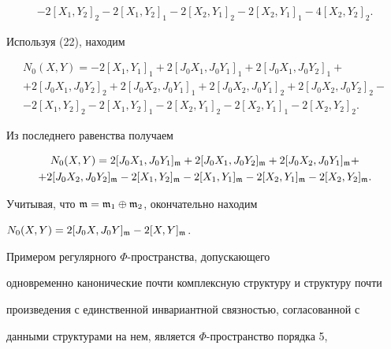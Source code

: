 \begin{pf}
\begin{multline*}
-2[X_1,Y_2]_2-2[X_1,Y_2]_1-2[X_2,Y_1]_2- 


2[X_2,Y_1]_1-4[X_2,Y_2]_2. 


\end{multline*} 


Используя (22), находим 


\begin{multline*} 


N_0(X,Y)=-2[X_1,Y_1]_1+2[J_0X_1,J_0Y_1]_1+ 


2[J_0X_1,J_0Y_2]_1 + \\ 


+2[J_0X_1,J_0Y_2]_2+2[J_0X_2,J_0Y_1]_1+ 


2[J_0X_2,J_0Y_1]_2+2[J_0X_2,J_0Y_2]_2- \\ 


-2[X_1,Y_2]_2-2[X_1,Y_2]_1-2[X_2,Y_1]_2- 


2[X_2,Y_1]_1-2[X_2,Y_2]_2. 


\end{multline*} 


Из последнего равенства получаем 


\begin{multline*} 


N_0(X,Y)=2[J_0X_1,J_0Y_1]_{\frak m}+ 


2[J_0X_1,J_0Y_2]_{\frak m}+2[J_0X_2,J_0Y_1]_{\frak m}+ \\ 


% 


+2[J_0X_2,J_0Y_2]_{\frak m}-2[X_1,Y_2]_{\frak m}- 


2[X_1,Y_1]_{\frak m}-2[X_2,Y_1]_{\frak m}- 


2[X_2,Y_2]_{\frak m}. 


\end{multline*} 


Учитывая, что $\frak m=\frak m_1\oplus\frak m_2$, окончательно находим 


$N_0(X,Y)=2[J_0X,J_0Y]_{\frak m}-2[X,Y]_{\frak m}$. 


\end{pf} 


 


Примером регулярного $\Phi$-пространства, допускающего 


одновременно канонические почти комплексную структуру и структуру почти 


произведения с единственной инвариантной связностью, согласованной с 


данными структурами на нем, является $\Phi$-пространство порядка 5, 


